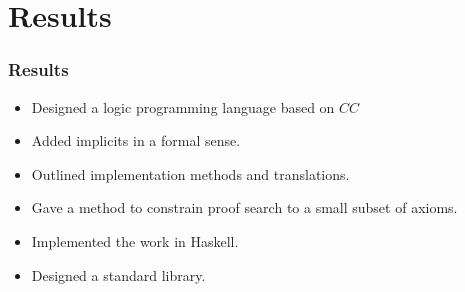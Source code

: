 \section{Results}

\begin{frame}
\frametitle{Results}
\begin{itemize}
\item Designed a logic programming language based on $CC$
\item Added implicits in a formal sense.
\item Outlined implementation methods and translations.
\item Gave a method to constrain proof search to a small subset of axioms.
\item Implemented the work in Haskell.
\item Designed a standard library.
\end{itemize}
\end{frame}

